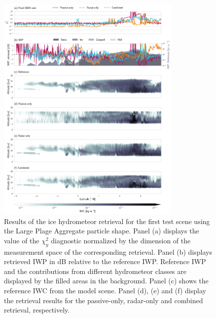\begin{figure}
\centering
\includegraphics[width = 0.8\textwidth]{../plots/results_a_LargePlateAggregate}
\caption{Results of the ice hydrometeor retrieval for the first test scene using
  the Large Plage Aggregate particle shape. Panel (a) displays the value of the
  $\chi^2_y$ diagnostic normalized by the dimension of the measurement space of
  the corresponding retrieval. Panel (b) displays retrieved IWP in dB relative
  to the reference IWP. Reference IWP and the contributions from different
  hydrometeor classes are displayed by the filled areas in the background. Panel
  (c) shows the reference IWC from the model scene. Panel (d), (e) and (f)
  display the retrieval results for the passive-only, radar-only and combined
  retrieval, respectively.}
\label{fig:results_a}
\end{figure}

%


